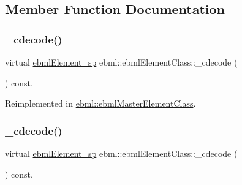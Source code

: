 \subsection{Member Function Documentation}
\mbox{\label{classebml_1_1ebmlElementClass_a81f0713cca953599d74185aa24c4c2c1}} 
\subsubsection{\texorpdfstring{\+\_\+cdecode()}{\_cdecode()}\hspace{0.1cm}{\footnotesize\ttfamily [1/2]}}
{\footnotesize\ttfamily virtual \mbox{\hyperlink{namespaceebml_adad533b7705a16bb360fe56380c5e7be}{ebml\+Element\+\_\+sp}} ebml\+::ebml\+Element\+Class\+::\+\_\+cdecode (\begin{DoxyParamCaption}\item[{const \mbox{\hyperlink{classebml_1_1parseString}{parse\+String}} \&}]{ }\end{DoxyParamCaption}) const\hspace{0.3cm}{\ttfamily [protected]}, {\ttfamily [virtual]}}



Reimplemented in \mbox{\hyperlink{classebml_1_1ebmlMasterElementClass_a8b57f2fe211ab7a418f8b7d4a981a1d7}{ebml\+::ebml\+Master\+Element\+Class}}.

\mbox{\label{classebml_1_1ebmlElementClass_ae423476637d4ca052cd7aa0047f2b3eb}} 
\subsubsection{\texorpdfstring{\+\_\+cdecode()}{\_cdecode()}\hspace{0.1cm}{\footnotesize\ttfamily [2/2]}}
{\footnotesize\ttfamily virtual \mbox{\hyperlink{namespaceebml_adad533b7705a16bb360fe56380c5e7be}{ebml\+Element\+\_\+sp}} ebml\+::ebml\+Element\+Class\+::\+\_\+cdecode (\begin{DoxyParamCaption}\item[{const \mbox{\hyperlink{classebml_1_1parseFile}{parse\+File}} \&}]{ }\end{DoxyParamCaption}) const\hspace{0.3cm}{\ttfamily [protected]}, {\ttfamily [virtual]}}



